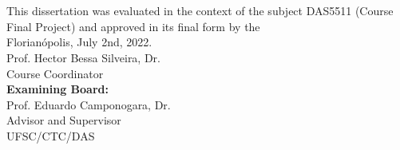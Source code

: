 \imprimircapa

\imprimirfolhaderosto*

\begin{fichacatalografica}
	
\end{fichacatalografica}

\begin{folhadeaprovacao}
	\OnehalfSpacing
	\centering
	\imprimirautor\\%
	\vspace*{10pt}		
	\textbf{\imprimirtitulo}%
	\ifnotempty{\imprimirsubtitulo}{:~\imprimirsubtitulo}\\%
	\vspace*{\baselineskip}
	
	This dissertation was evaluated in the context of the subject DAS5511 (Course Final Project) and approved in its final form by the \imprimircurso\\
	\vspace*{\baselineskip}
	Florianópolis, July 2nd, 2022.\\
	
	
	\vspace*{2\baselineskip}
	Prof. Hector Bessa Silveira, Dr.\\
	Course Coordinator\\
	
	\vspace*{\baselineskip}
	\textbf{Examining Board:} \\
	
	
	\vspace*{2\baselineskip}
	Prof. Eduardo Camponogara, Dr.\\
	Advisor and Supervisor \\
	UFSC/CTC/DAS\\
	

\end{folhadeaprovacao}
